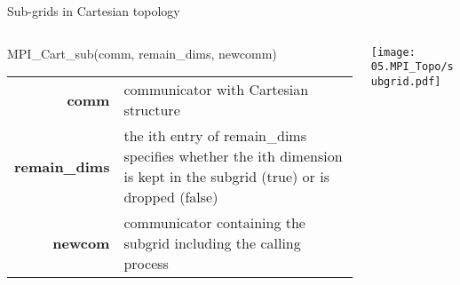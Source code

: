 \documentclass[aspectratio=43]{beamer}
\begin{document}
\begin{frame}[fragile]{Sub-grids in Cartesian topology}
\begin{columns}
\begin{column}{0.5\paperwidth}
\begin{Pseudolisting}[]{}
MPI_Cart_sub(comm, remain_dims,
             newcomm)
\end{Pseudolisting}
\begin{black1block}{}
\begin{tabular}{rp{3cm}}
\textbf{comm} & communicator with Cartesian structure\\
\textbf{remain\_dims} & the ith entry of remain\_dims specifies whether the ith dimension is kept in the subgrid (true) or is dropped (false)\\
\textbf{newcom} & communicator containing the subgrid including the calling process\\
\end{tabular}
\end{black1block}
\end{column}
\begin{column}{0.49\paperwidth}
\texttt{[image: 05.MPI\_Topo/subgrid.pdf]}
\end{column}
\end{columns}
\end{frame}
\end{document}
